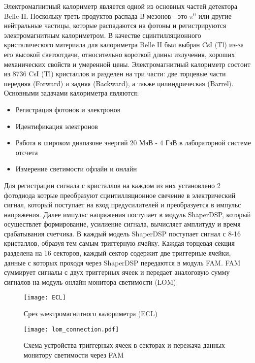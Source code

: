   Электромагнитный калориметр является одной из основных частей детектора Belle II. Поскольку треть продуктов распада B-мезонов - это $\pi^0$ или другие нейтральные частицы, которые распадаются на фотоны и регистрируются электромагнитным калориметром. В качестве сцинтилляционного кристалического материала для калориметра Belle II был выбран CsI (Tl) из-за его высокой светоотдачи, относительно короткой длины излучения, хороших механических свойств и умеренной цены. Электромагнитный калориметр состоит из 8736 CsI (Tl) кристаллов и разделен на три части: две торцевые части передняя (Forward) и задняя (Backward), а также цилиндрическая (Barrel).
Основными задачами калориметра являются:
\begin{itemize}
  \item Регистрация фотонов и электронов
  \item Идентификация электронов
  \item Работа в широком диапазоне энергий 20 МэВ - 4 ГэВ в лабораторной системе отсчета
  \item Измерение светимости офлайн и онлайн
\end{itemize}\par
  Для регистрации сигнала с кристаллов на каждом из них установлено 2 фотодиода котрые преобразуют сцинтилляционное свечение в электрический сигнал, который поступает на вход предусилителей и преобразуется в импульс напряжения. Далее импульс напряжения поступает в модуль ShaperDSP, который осуществлет формирование, усилиение сигнала, вычисляет амплитуду и время срабатывания счетчика. В каждый модель ShaperDSP поступает сигнал с 8-16 кристаллов, образуя тем самым триггерную ячейку. Каждая торцевая секция разделена на 16 секторов, каждый сектор содержит две триггерные ячейки, данные с которых проходя через ShaperDSP передаются в модуль FAM. FAM суммирует сигналы с двух триггерных ячеек и передает аналоговую сумму сигналов на модуль онлайн монитора светимости (LOM).
\begin{figure}
\centering
\begin{minipage}[t]{.5\textwidth}
  \centering
  \texttt{[image: ECL]}
  \caption{Срез электромагнитного калориметра (ECL)}
  \label{fig:test1}
\end{minipage}%
\begin{minipage}[t]{.5\textwidth}
  \centering
  \texttt{[image: lom\_connection.pdf]}
  \caption{Схема устройства триггерных ячеек в секторах и пережача данных монитору светимости через FAM}
  \label{fig:test2}
\end{minipage}
\end{figure}
